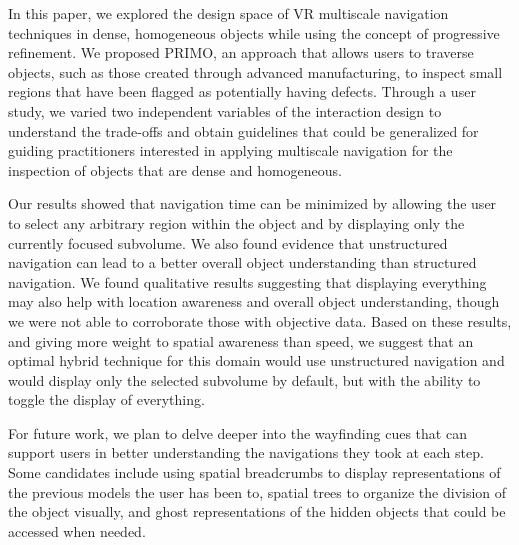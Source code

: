 In this paper, we explored the design space of VR multiscale navigation techniques in dense, homogeneous objects while using the concept of progressive refinement. We proposed PRIMO, an approach that allows users to traverse objects, such as those created through advanced manufacturing, to inspect small regions that have been flagged as potentially having defects. Through a user study, we varied two independent variables of the interaction design to understand the trade-offs and obtain guidelines that could be generalized for guiding practitioners interested in applying multiscale navigation for the inspection of objects that are dense and homogeneous.

Our results showed that navigation time can be minimized by allowing the user to select any arbitrary region within the object and by displaying only the currently focused subvolume. We also found evidence that unstructured navigation can lead to a better overall object understanding than structured navigation. We found qualitative results suggesting that displaying everything may also help with location awareness and overall object understanding, though we were not able to corroborate those with objective data. Based on these results, and giving more weight to spatial awareness than speed, we suggest that an optimal hybrid technique for this domain would use unstructured navigation and would display only the selected subvolume by default, but with the ability to toggle the display of everything.

For future work, we plan to delve deeper into the wayfinding cues that can support users in better understanding the navigations they took at each step. Some candidates include using spatial breadcrumbs to display representations of the previous models the user has been to, spatial trees to organize the division of the object visually, and ghost representations of the hidden objects that could be accessed when needed.